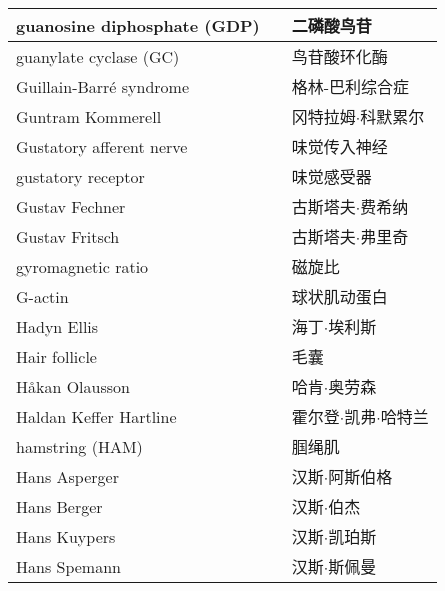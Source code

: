 \begin{longtable}{lll}
	\midrule
	guanosine diphosphate (GDP)    &&  二磷酸鸟苷  \\
	
	\midrule
	guanylate cyclase (GC)    &&  鸟苷酸环化酶  \\
	
	\midrule
	Guillain-Barré syndrome   &&  格林-巴利综合症  \\
	
	\midrule
	Guntram Kommerell   &&  冈特拉姆$\cdot$科默累尔  \\
	
	\midrule
	Gustatory afferent nerve     &&  味觉传入神经  \\
	
	\midrule
	gustatory receptor     &&  味觉感受器  \\
	
	\midrule
	Gustav Fechner     &&  古斯塔夫$\cdot$费希纳  \\
	
	\midrule
	Gustav Fritsch     &&  古斯塔夫$\cdot$弗里奇  \\
	
	\midrule
	gyromagnetic ratio     &&  磁旋比  \\
	
	\midrule
	G-actin    &&  球状肌动蛋白  \\
	
	\midrule
	Hadyn Ellis    &&  海丁$\cdot$埃利斯  \\
	
	\midrule
	Hair follicle    &&  毛囊  \\
	
	\midrule
	Håkan Olausson    &&  哈肯$\cdot$奥劳森  \\
	
	\midrule
	Haldan Keffer Hartline    &&  霍尔登$\cdot$凯弗$\cdot$哈特兰  \\
	
	\midrule
	hamstring (HAM)    &&  腘绳肌  \\
	
	\midrule
	Hans Asperger    &&  汉斯$\cdot$阿斯伯格  \\
	
	\midrule
	Hans Berger    &&  汉斯$\cdot$伯杰  \\
	
	\midrule
	Hans Kuypers    &&  汉斯$\cdot$凯珀斯  \\
	
	\midrule
	Hans Spemann    &&  汉斯$\cdot$斯佩曼  \\
	

\end{longtable}
